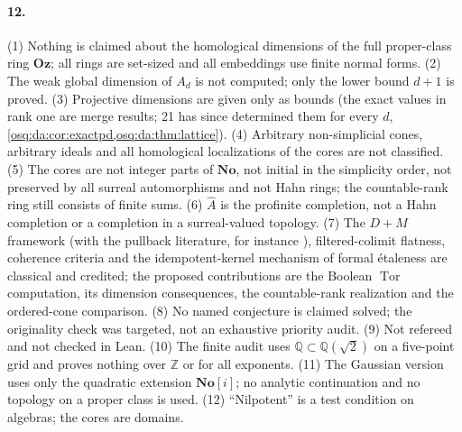 \documentclass[11pt,letterpaper]{article}
\numberwithin{equation}{section}
\theoremstyle{definition}
\theoremstyle{remark}
\theoremstyle{plain}
\newcommand{\No}{\mathbf{No}}
\newcommand{\Oz}{\mathbf{Oz}}
\newcommand{\SC}{\No[i]}
\newcommand{\Z}{\mathbb Z}
\newcommand{\Q}{\mathbb Q}
\newcommand{\Tor}{\operatorname{Tor}}
\begin{document}
\paragraph{12.} (1) Nothing is claimed about the homological dimensions of the full proper-class ring $\Oz$; all
rings are set-sized and all embeddings use finite normal forms. (2) The weak global dimension of $A_d$ is not computed;
only the lower bound $d+1$ is proved. (3) Projective dimensions are given only as bounds (the exact values in rank one
are merge results; 21 has since determined them for every $d$, \cref{osq:da:cor:exactpd,osq:da:thm:lattice}). (4) Arbitrary non-simplicial cones, arbitrary ideals and all homological localizations of the cores
are not classified. (5) The cores are not integer parts of $\No$, not initial in the simplicity order, not preserved by
all surreal automorphisms and not Hahn rings; the countable-rank ring still consists of finite sums. (6) $\widehat A$ is
the profinite completion, not a Hahn completion or a completion in a surreal-valued topology. (7) The $D+M$ framework
(with the pullback literature, for instance \cite{WKX}), filtered-colimit flatness, coherence criteria and the
idempotent-kernel mechanism of formal \'etaleness are classical and credited; the proposed contributions are the
Boolean $\Tor$ computation, its dimension consequences, the countable-rank realization and the ordered-cone comparison.
(8) No named conjecture is claimed solved; the originality check was targeted, not an exhaustive priority audit.
(9) Not refereed and not checked in Lean. (10) The finite audit uses $\Q\subset\Q(\sqrt2)$ on a five-point grid and proves
nothing over $\Z$ or for all exponents. (11) The Gaussian version uses only the quadratic extension $\SC$; no analytic
continuation and no topology on a proper class is used. (12) ``Nilpotent'' is a test condition on algebras; the cores are
domains.
\end{document}
